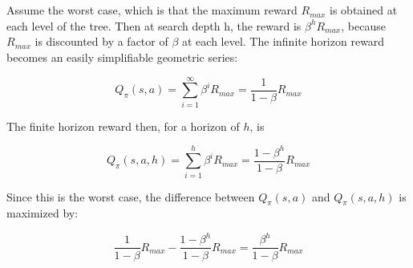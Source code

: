\documentclass{article}
\begin{document}
\newpage


\section{}

Assume the worst case, which is that the maximum reward $R_{max}$ is obtained
at each level of the tree. Then at search depth h, the reward is
$\beta^h R_{max}$, because $R_{max}$ is discounted by a factor of $\beta$ at
each level. The infinite horizon reward becomes an easily simplifiable
geometric series:

\[
Q_\pi(s,a) = \sum_{i = 1}^{\infty} \beta^i R_{max} =
\frac{1}{1-\beta}R_{max}
\]

The finite horizon reward then, for a horizon of $h$, is

\[
Q_\pi(s,a,h) = \sum_{i = 1}^{h} \beta^i R_{max} = 
\frac{1-\beta^h}{1-\beta}R_{max}
\]

Since this is the worst case, the difference between $Q_\pi(s,a)$ and
$Q_\pi(s,a,h)$ is maximized by:

\[
\frac{1}{1-\beta}R_{max} - \frac{1-\beta^h}{1-\beta}R_{max} =
\frac{\beta^h}{1-\beta}R_{max}
\]

\newpage
\end{document}
